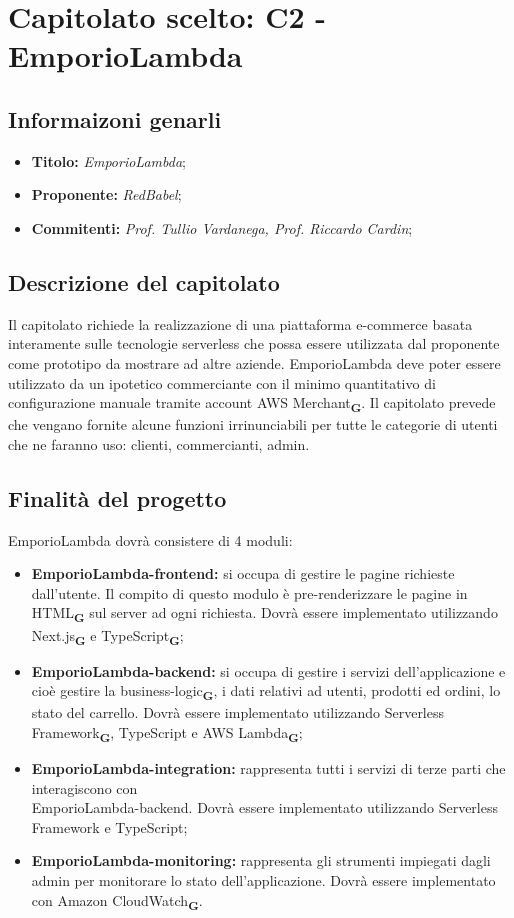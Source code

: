 \section{Capitolato scelto: C2 -  	EmporioLambda}
\subsection{Informaizoni genarli}
\begin{itemize}
    \item \textbf{Titolo:} \textit{EmporioLambda};
    \item \textbf{Proponente:} \textit{RedBabel};
    \item \textbf{Commitenti:} \textit{Prof. Tullio Vardanega, Prof. Riccardo Cardin};
\end{itemize}
\subsection{Descrizione del capitolato}
Il capitolato richiede la realizzazione di una piattaforma e-commerce 
basata interamente sulle tecnologie serverless che possa essere utilizzata 
dal proponente come prototipo da mostrare ad altre aziende. EmporioLambda 
deve poter essere utilizzato da un ipotetico commerciante con il minimo 
quantitativo di configurazione manuale tramite account AWS Merchant\textsubscript{\textbf{G}}. 
Il capitolato prevede che vengano fornite alcune funzioni irrinunciabili 
per tutte le categorie di utenti che ne faranno uso: clienti, commercianti,
 admin.
\subsection{Finalità del progetto}
EmporioLambda dovrà consistere di 4 moduli: 
\begin{itemize}
    \item \textbf{EmporioLambda-frontend:} si occupa di gestire le pagine richieste dall’utente. Il compito di questo modulo è pre-renderizzare le pagine in HTML\textsubscript{\textbf{G}} sul server ad ogni richiesta. Dovrà essere implementato utilizzando Next.js\textsubscript{\textbf{G}} e TypeScript\textsubscript{\textbf{G}};
    \item \textbf{EmporioLambda-backend:} si occupa di gestire i servizi dell’applicazione e cioè gestire la business-logic\textsubscript{\textbf{G}}, i dati relativi ad utenti, prodotti ed ordini, lo stato del carrello. Dovrà essere implementato utilizzando Serverless Framework\textsubscript{\textbf{G}}, TypeScript e AWS Lambda\textsubscript{\textbf{G}};
    \item \textbf{EmporioLambda-integration:} rappresenta tutti i servizi di terze parti che interagiscono con \\EmporioLambda-backend. Dovrà essere implementato utilizzando Serverless Framework e TypeScript;
    \item \textbf{EmporioLambda-monitoring:} rappresenta gli strumenti impiegati dagli admin per monitorare lo stato dell’applicazione. Dovrà essere implementato con Amazon CloudWatch\textsubscript{\textbf{G}}.
\end{itemize}
